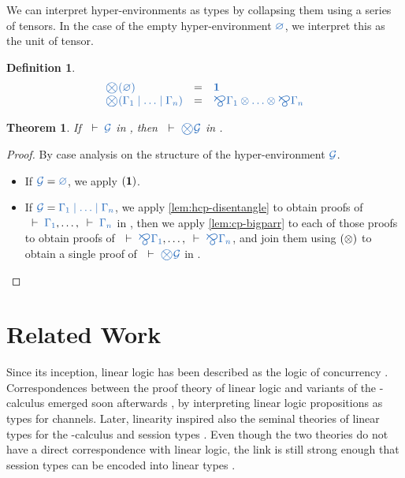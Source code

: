 \documentclass[draft,submission,copyright,creativecommons]{eptcs}
\newtheorem{definition}{Definition}
\newtheorem{theorem}{Theorem}
\begin{document}
We can interpret hyper-environments as types by collapsing them using a series
of tensors. In the case of the empty hyper-environment
$\ty{\emptyhypercontext}$, we interpret this as the unit of tensor.
\begin{definition}\label{def:bigtens}
  \begin{gather*}
  \begin{array}{lcl}
    \ty{\bigtens(\emptyhypercontext)}
    & = & \ty{\one}
    \\
    \ty{\bigtens(\Gamma_1 \hsep \dots \hsep \Gamma_n)}
    & = & \ty{\bigparr\Gamma_1 \tens \dots \tens \bigparr\Gamma_n}
  \end{array}
  \end{gather*}
\end{definition}

\begin{theorem}\label{thm:hcp2cp-bigtens}
  If $\seq{\mathcal{G}}$ in \hcp, then $\seq{\bigtens\mathcal{G}}$ in \cp.
\end{theorem}
\begin{proof}
  By case analysis on the structure of the hyper-environment $\ty{\mathcal{G}}$.
  \begin{itemize}
  \item
    If $\ty{\mathcal{G}} = \ty{\emptyhypercontext}$, we apply $(\mathbf{1})$.
  \item
    If $\ty{\mathcal{G}} = \ty{\Gamma_1 \hsep \dots \hsep \Gamma_n}$,
    we apply \cref{lem:hcp-disentangle} to obtain proofs of $\seq{\Gamma_1}, \dots,
    \seq{\Gamma_n}$ in \cp, then we apply \cref{lem:cp-bigparr} to each of
    those proofs to obtain proofs of $\seq{\bigparr\Gamma_1}, \dots,
    \seq{\bigparr\Gamma_n}$, and join them using $(\otimes)$ to obtain a single
    proof of $\seq{\bigtens\mathcal{G}}$ in \cp.
  \end{itemize}
\end{proof}

\section{Related Work}
\label{sec:related-work}

Since its inception, linear logic has been described as the logic of
concurrency \cite{girard1987}.
Correspondences between the proof theory of linear logic and variants of the
\textpi-calculus emerged soon afterwards \cite{abramsky1994,bellin1994}, by
interpreting linear logic propositions as types for channels.
Later, linearity inspired also the seminal theories of linear types for the
\textpi-calculus \cite{kobayashi1999} and session types \cite{honda1998}.
Even though the two theories do not have a direct correspondence with linear
logic, the link is still strong enough that session types
can be encoded into linear types \cite{dardha2017}.
\end{document}
